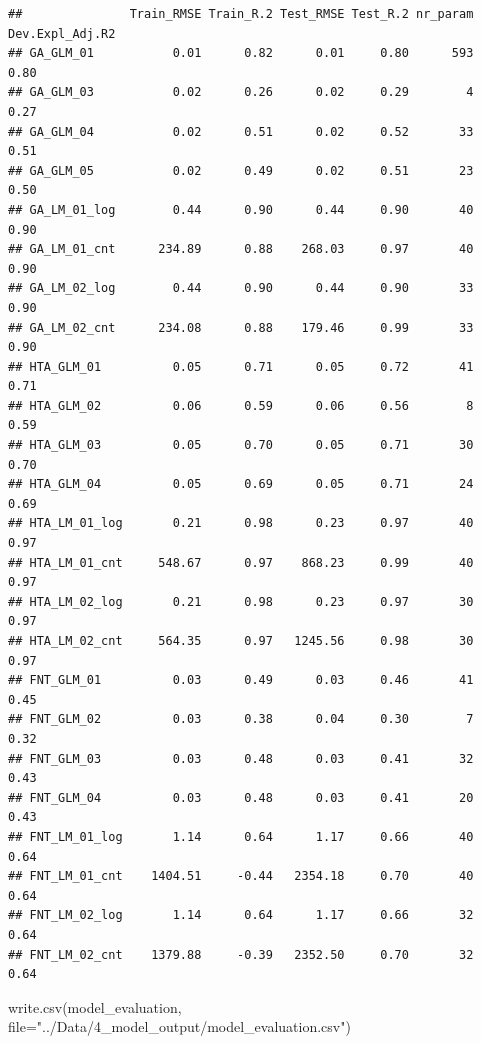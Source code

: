 \documentclass[
]{article}
\newenvironment{Shaded}{\begin{snugshade}}{\end{snugshade}}
\newcommand{\AttributeTok}[1]{\textcolor[rgb]{0.77,0.63,0.00}{#1}}
\newcommand{\FunctionTok}[1]{\textcolor[rgb]{0.00,0.00,0.00}{#1}}
\newcommand{\NormalTok}[1]{#1}
\newcommand{\StringTok}[1]{\textcolor[rgb]{0.31,0.60,0.02}{#1}}
\begin{document}
\begin{verbatim}
##               Train_RMSE Train_R.2 Test_RMSE Test_R.2 nr_param Dev.Expl_Adj.R2
## GA_GLM_01           0.01      0.82      0.01     0.80      593            0.80
## GA_GLM_03           0.02      0.26      0.02     0.29        4            0.27
## GA_GLM_04           0.02      0.51      0.02     0.52       33            0.51
## GA_GLM_05           0.02      0.49      0.02     0.51       23            0.50
## GA_LM_01_log        0.44      0.90      0.44     0.90       40            0.90
## GA_LM_01_cnt      234.89      0.88    268.03     0.97       40            0.90
## GA_LM_02_log        0.44      0.90      0.44     0.90       33            0.90
## GA_LM_02_cnt      234.08      0.88    179.46     0.99       33            0.90
## HTA_GLM_01          0.05      0.71      0.05     0.72       41            0.71
## HTA_GLM_02          0.06      0.59      0.06     0.56        8            0.59
## HTA_GLM_03          0.05      0.70      0.05     0.71       30            0.70
## HTA_GLM_04          0.05      0.69      0.05     0.71       24            0.69
## HTA_LM_01_log       0.21      0.98      0.23     0.97       40            0.97
## HTA_LM_01_cnt     548.67      0.97    868.23     0.99       40            0.97
## HTA_LM_02_log       0.21      0.98      0.23     0.97       30            0.97
## HTA_LM_02_cnt     564.35      0.97   1245.56     0.98       30            0.97
## FNT_GLM_01          0.03      0.49      0.03     0.46       41            0.45
## FNT_GLM_02          0.03      0.38      0.04     0.30        7            0.32
## FNT_GLM_03          0.03      0.48      0.03     0.41       32            0.43
## FNT_GLM_04          0.03      0.48      0.03     0.41       20            0.43
## FNT_LM_01_log       1.14      0.64      1.17     0.66       40            0.64
## FNT_LM_01_cnt    1404.51     -0.44   2354.18     0.70       40            0.64
## FNT_LM_02_log       1.14      0.64      1.17     0.66       32            0.64
## FNT_LM_02_cnt    1379.88     -0.39   2352.50     0.70       32            0.64
\end{verbatim}

\begin{Shaded}
\begin{Highlighting}[]
\FunctionTok{write.csv}\NormalTok{(model\_evaluation, }\AttributeTok{file=}\StringTok{"../Data/4\_model\_output/model\_evaluation.csv"}\NormalTok{)}
\end{Highlighting}
\end{Shaded}
\end{document}
